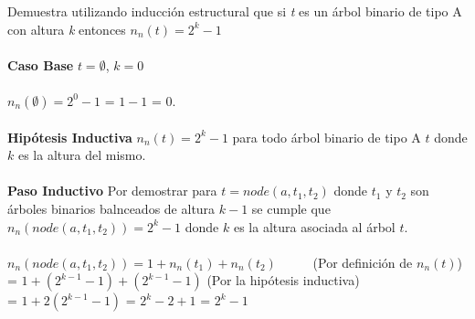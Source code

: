     \bigskip
    
    \begin{exercise}
        Demuestra utilizando inducción estructural que si \textit{t} es un árbol binario de tipo A con altura \textit{k} entonces $n_n(t) = 2^k - 1$ \\\\
        \textbf{Caso Base} $t = \emptyset$, $k=0$\\\\
            $n_n(\emptyset) = 2^0 -1 $ = $1 -1$ = 0.\\\\
        \textbf{Hipótesis Inductiva} $n_n(t) = 2^k - 1$ para todo árbol binario de tipo A $t$ donde $k$ es la altura del mismo. \\\\
        \textbf{Paso Inductivo} Por demostrar para $t = node(a,t_1,t_2)$ donde $t_1$ y $t_2$ son árboles binarios balnceados de altura $k-1$ se cumple que $n_n(node(a,t_1,t_2)) = 2^k - 1$ donde $k$ es la altura asociada al árbol $t$. \\\\
            $n_n(node(a,t_1,t_2)) = 1 + n_n(t_1) + n_n(t_2)$ \quad \quad \quad \quad \quad \quad \ \ \ \ \   (Por definición de $n_n(t)$) \\
            = $1 + (2^{k-1} - 1) + (2^{k-1} - 1)$ \qquad \qquad \qquad \qquad \qquad \qquad  (Por la hipótesis inductiva) \\
            = $1 + 2(2^{k-1} - 1)$ = $2^k - 2 + 1$ = $2^k - 1$
    \end{exercise}

    \bigskip

